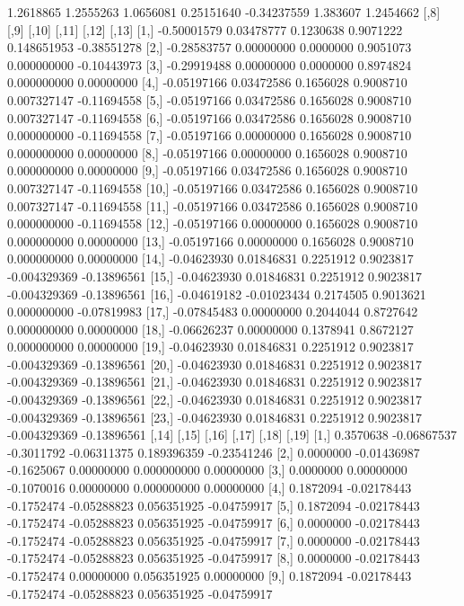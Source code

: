 \documentclass[a4paper]{article}
\begin{document}
\begin{Schunk}
\begin{Soutput}
[23,] 1.2618865 1.2555263 1.0656081 0.25151640 -0.34237559 1.383607 1.2454662
             [,8]        [,9]     [,10]     [,11]        [,12]       [,13]
 [1,] -0.50001579  0.03478777 0.1230638 0.9071222  0.148651953 -0.38551278
 [2,] -0.28583757  0.00000000 0.0000000 0.9051073  0.000000000 -0.10443973
 [3,] -0.29919488  0.00000000 0.0000000 0.8974824  0.000000000  0.00000000
 [4,] -0.05197166  0.03472586 0.1656028 0.9008710  0.007327147 -0.11694558
 [5,] -0.05197166  0.03472586 0.1656028 0.9008710  0.007327147 -0.11694558
 [6,] -0.05197166  0.03472586 0.1656028 0.9008710  0.000000000 -0.11694558
 [7,] -0.05197166  0.00000000 0.1656028 0.9008710  0.000000000  0.00000000
 [8,] -0.05197166  0.00000000 0.1656028 0.9008710  0.000000000  0.00000000
 [9,] -0.05197166  0.03472586 0.1656028 0.9008710  0.007327147 -0.11694558
[10,] -0.05197166  0.03472586 0.1656028 0.9008710  0.007327147 -0.11694558
[11,] -0.05197166  0.03472586 0.1656028 0.9008710  0.000000000 -0.11694558
[12,] -0.05197166  0.00000000 0.1656028 0.9008710  0.000000000  0.00000000
[13,] -0.05197166  0.00000000 0.1656028 0.9008710  0.000000000  0.00000000
[14,] -0.04623930  0.01846831 0.2251912 0.9023817 -0.004329369 -0.13896561
[15,] -0.04623930  0.01846831 0.2251912 0.9023817 -0.004329369 -0.13896561
[16,] -0.04619182 -0.01023434 0.2174505 0.9013621  0.000000000 -0.07819983
[17,] -0.07845483  0.00000000 0.2044044 0.8727642  0.000000000  0.00000000
[18,] -0.06626237  0.00000000 0.1378941 0.8672127  0.000000000  0.00000000
[19,] -0.04623930  0.01846831 0.2251912 0.9023817 -0.004329369 -0.13896561
[20,] -0.04623930  0.01846831 0.2251912 0.9023817 -0.004329369 -0.13896561
[21,] -0.04623930  0.01846831 0.2251912 0.9023817 -0.004329369 -0.13896561
[22,] -0.04623930  0.01846831 0.2251912 0.9023817 -0.004329369 -0.13896561
[23,] -0.04623930  0.01846831 0.2251912 0.9023817 -0.004329369 -0.13896561
          [,14]       [,15]      [,16]       [,17]       [,18]       [,19]
 [1,] 0.3570638 -0.06867537 -0.3011792 -0.06311375 0.189396359 -0.23541246
 [2,] 0.0000000 -0.01436987 -0.1625067  0.00000000 0.000000000  0.00000000
 [3,] 0.0000000  0.00000000 -0.1070016  0.00000000 0.000000000  0.00000000
 [4,] 0.1872094 -0.02178443 -0.1752474 -0.05288823 0.056351925 -0.04759917
 [5,] 0.1872094 -0.02178443 -0.1752474 -0.05288823 0.056351925 -0.04759917
 [6,] 0.0000000 -0.02178443 -0.1752474 -0.05288823 0.056351925 -0.04759917
 [7,] 0.0000000 -0.02178443 -0.1752474 -0.05288823 0.056351925 -0.04759917
 [8,] 0.0000000 -0.02178443 -0.1752474  0.00000000 0.056351925  0.00000000
 [9,] 0.1872094 -0.02178443 -0.1752474 -0.05288823 0.056351925 -0.04759917

\end{Soutput}
\end{Schunk}
\end{document}
